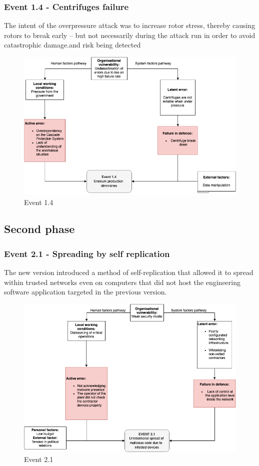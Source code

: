 \documentclass[12pt]{article}
\begin{document}
      \subsubsection{Event 1.4 - Centrifuges failure}
      The intent of the overpressure attack was to increase rotor stress, thereby causing rotors to break early – but not necessarily during the attack run in order to avoid catastrophic damage.and risk being detected
        \begin{figure}[H]
        \centering
        \includegraphics[height=0.6\textwidth]{event14.png}
        \caption{Event 1.4}
        \label{fig:event14}
        \end{figure}
        
    \subsection{Second phase}
    \subsubsection{Event 2.1 - Spreading by self replication}
    The new version introduced a method of self-replication that allowed it to spread within trusted networks even on computers that did not host the engineering software application targeted in the previous version.
    
        \begin{figure}[H]
        \centering
        \includegraphics[height=0.6\textwidth]{event21.png}
        \caption{Event 2.1}
        \label{fig:event21}
        \end{figure}
        
\end{document}
